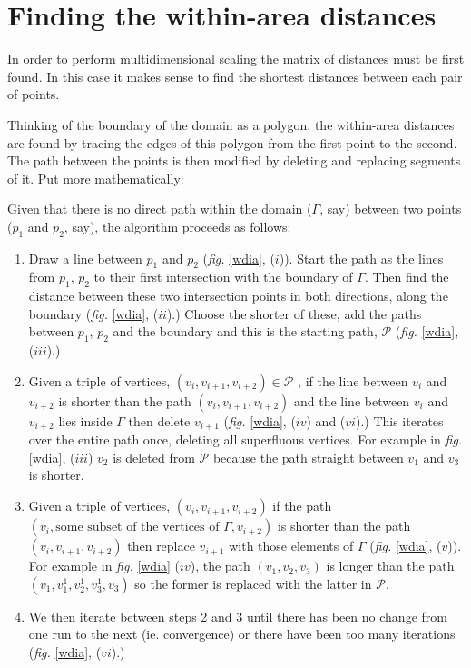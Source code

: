 \documentclass[a4paper,10pt]{article}
\newcommand{\fig}[1]{\emph{fig.} \ref{#1}}
\begin{document}
\section{Finding the within-area distances}

In order to perform multidimensional scaling the matrix of distances must be first found. In this case it makes sense to find the shortest distances between each pair of points.

Thinking of the boundary of the domain as a polygon, the within-area distances are found by tracing the edges of this polygon from the first point to the second. The path between the points is then modified by deleting and replacing segments of it. Put more mathematically:

Given that there is no direct path within the domain ($\Gamma$, say) between two points ($p_1$ and $p_2$, say), the algorithm proceeds as follows:

\begin{enumerate}
\item Draw a line between $p_1$ and $p_2$ (\fig{wdia}, ($i$)). Start the path as the lines from $p_1$, $p_2$ to their first intersection with the boundary of $\Gamma$. Then find the distance between these two intersection points in both directions, along the boundary (\fig{wdia}, ($ii$).) Choose the shorter of these, add the paths between $p_1$, $p_2$ and the boundary and this is the starting path, $\mathcal{P}$ (\fig{wdia}, ($iii$).) 
\item Given a triple of vertices, $(v_i, v_{i+1}, v_{i+2}) \in \mathcal{P}$ , if the line between $v_i$ and $v_{i+2}$ is shorter than the path $(v_i, v_{i+1}, v_{i+2})$ and the line between $v_i$ and $v_{i+2}$ lies inside $\Gamma$ then delete $v_{i+1}$ (\fig{wdia}, ($iv$) and ($vi$).) This iterates over the entire path once, deleting all superfluous vertices. For example in \fig{wdia}, ($iii$) $v_2$ is deleted from $\mathcal{P}$ because the path straight between $v_1$ and $v_3$ is shorter. 
\item Given a triple of vertices, $(v_i, v_{i+1}, v_{i+2})$ if the path $(v_i, \text{some subset of the vertices of } \Gamma, v_{i+2})$ is shorter than the path $(v_i, v_{i+1}, v_{i+2})$ then replace $v_{i+1}$ with those elements of $\Gamma$ (\fig{wdia}, ($v$)). For example in \fig{wdia} ($iv$), the path $(v_1, v_2, v_3)$ is longer than the path $(v_1, v^1_1, v^1_2, v^1_3, v_3)$ so the former is replaced with the latter in $\mathcal{P}$.
\item We then iterate between steps 2 and 3 until there has been no change from one run to the next (ie. convergence) or there have been too many iterations (\fig{wdia}, ($vi$).)
\end{enumerate}
\end{document}
